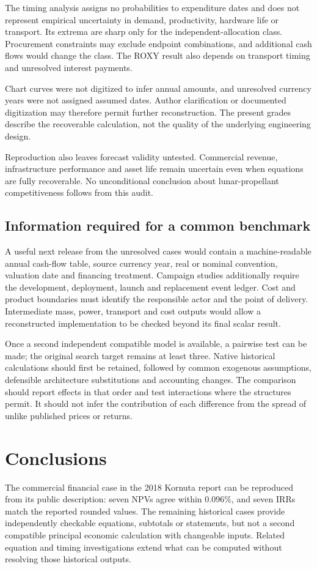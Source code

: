 \documentclass[final,5p,times,twocolumn]{elsarticle}
\begin{document}
The timing analysis assigns no probabilities to expenditure dates and does not represent empirical uncertainty in demand, productivity, hardware life or transport. Its extrema are sharp only for the independent-allocation class. Procurement constraints may exclude endpoint combinations, and additional cash flows would change the class. The ROXY result also depends on transport timing and unresolved interest payments.

Chart curves were not digitized to infer annual amounts, and unresolved currency years were not assigned assumed dates. Author clarification or documented digitization may therefore permit further reconstruction. The present grades describe the recoverable calculation, not the quality of the underlying engineering design.

Reproduction also leaves forecast validity untested. Commercial revenue, infrastructure performance and asset life remain uncertain even when equations are fully recoverable. No unconditional conclusion about lunar-propellant competitiveness follows from this audit.

\subsection{Information required for a common benchmark}
A useful next release from the unresolved cases would contain a machine-readable annual cash-flow table, source currency year, real or nominal convention, valuation date and financing treatment. Campaign studies additionally require the development, deployment, launch and replacement event ledger. Cost and product boundaries must identify the responsible actor and the point of delivery. Intermediate mass, power, transport and cost outputs would allow a reconstructed implementation to be checked beyond its final scalar result.

Once a second independent compatible model is available, a pairwise test can be made; the original search target remains at least three. Native historical calculations should first be retained, followed by common exogenous assumptions, defensible architecture substitutions and accounting changes. The comparison should report effects in that order and test interactions where the structures permit. It should not infer the contribution of each difference from the spread of unlike published prices or returns.

\section{Conclusions}
The commercial financial case in the 2018 Kornuta report can be reproduced from its public description: seven NPVs agree within 0.096\%, and seven IRRs match the reported rounded values. The remaining historical cases provide independently checkable equations, subtotals or statements, but not a second compatible principal economic calculation with changeable inputs. Related equation and timing investigations extend what can be computed without resolving those historical outputs.
\end{document}
